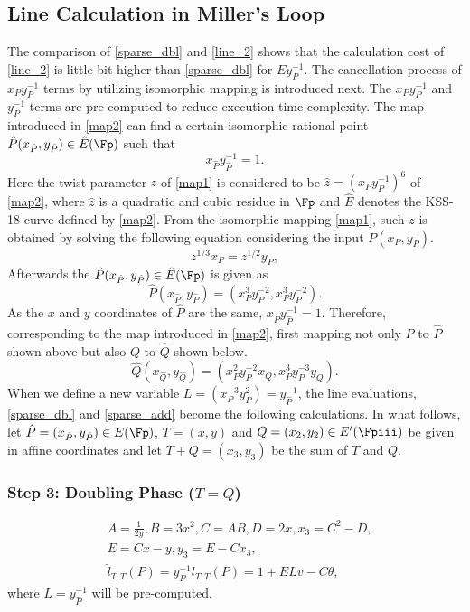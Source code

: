 \subsection{Line Calculation in Miller's Loop} 
The comparison of \eqref{sparse_dbl} and \eqref{line_2} shows that the calculation cost of \eqref{line_2} is little bit higher than \eqref{sparse_dbl} for $Ey_P^{-1}$. The  cancellation process of $x_Py_P^{-1}$ terms by utilizing isomorphic mapping is introduced next. The $x_Py_P^{-1}$ and $y_P^{-1}$ terms are pre-computed to reduce execution time complexity.
The map introduced in \eqref{map2} can find a certain isomorphic rational point $\hat{P}(x_{\hat{P}},y_{\hat{P}})\in \hat{E}(\Fp)$ such that
\begin{equation}
	x_{\hat{P}}y_{\hat{P}}^{-1}=1.
\end{equation}
Here the twist parameter $z$ of  \eqref{map1} is considered to be $\hat{z}=(x_Py_P^{-1})^6$ of \eqref{map2}, where $\hat{z}$ is a quadratic and cubic residue in $\Fp$ and $\hat{E}$ denotes the KSS-18 curve defined by  \eqref{map2}. From the isomorphic mapping \eqref{map1}, such $z$ is obtained by solving the following equation considering the input $P(x_P,y_P)$.
\begin{equation}
	z^{1/3}x_P=z^{1/2}y_P,
\end{equation}
Afterwards the $\hat{P}(x_{\hat{P}},y_{\hat{P}})\in \hat{E}(\Fp)$ is given as
\begin{equation}
	\hat{P}(x_{\hat{P}},y_{\hat{P}})=(x_P^3y_P^{-2},x_P^3y_P^{-2}).
\end{equation}
As the $x$ and $y$ coordinates of $\hat{P}$ are the same, $x_{\hat{P}}y_{\hat{P}}^{-1}=1$. Therefore, corresponding to the map introduced in \eqref{map2}, first mapping not only $P$ to $\hat{P}$ shown above but also $Q$ to $\hat{Q}$ shown below.
\begin{equation}
	\hat{Q}(x_{\hat{Q}},y_{\hat{Q}})=(x_P^2y_P^{-2}x_Q,x_P^3y_P^{-3}y_Q).
\end{equation}
When we define a new variable $L=(x_P^{-3}y_P^2)=y_{\hat{P}}^{-1}$, the line evaluations, \eqref{sparse_dbl} and \eqref{sparse_add} become the following calculations.
In what follows, let $\hat{P}=(x_{\hat{P}},y_{\hat{P}})\in E(\Fp)$, $T=(x,y)$ and $Q=(x_2,y_2)\in E'(\Fpiii)$ be given in affine coordinates and let $T+Q=(x_3,y_3)$ be the sum of $T$ and $Q$.
\subsubsection{Step 3: Doubling Phase \texorpdfstring{($T=Q$)}{}}
\begin{eqnarray}
&A=\frac{1}{2y}, B=3x^2, C=AB, D=2x, x_3=C^2-D,\nonumber\\
&E=Cx-y, y_3=E-Cx_3,\nonumber\\
&\hat{l}_{T,T}(P) = y^{-1}_Pl_{T,T}(P)=1+ELv-C\theta,\label{pseudo_dbl}
\end{eqnarray}
where $L=y_{\hat{P}}^{-1}$ will be pre-computed.
